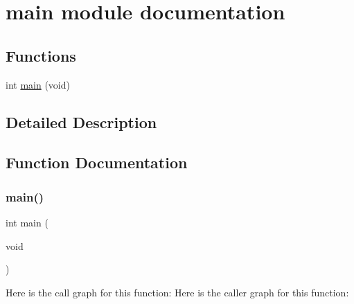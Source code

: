 \hypertarget{group__main__module}{}\section{main module documentation}
\label{group__main__module}
\subsection*{Functions}
\begin{DoxyCompactItemize}
\item 
int \hyperlink{group__main__module_ga840291bc02cba5474a4cb46a9b9566fe}{main} (void)
\end{DoxyCompactItemize}


\subsection{Detailed Description}


\subsection{Function Documentation}
\mbox{\label{group__main__module_ga840291bc02cba5474a4cb46a9b9566fe}} 
\subsubsection{\texorpdfstring{main()}{main()}}
{\footnotesize\ttfamily int main (\begin{DoxyParamCaption}\item[{void}]{ }\end{DoxyParamCaption})}

Here is the call graph for this function\+:
Here is the caller graph for this function\+:
